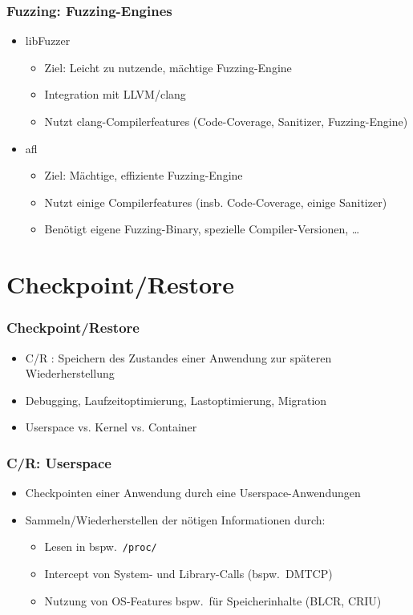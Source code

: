 \documentclass[handout]{beamer}
\begin{document}
\begin{frame}
    \frametitle{Fuzzing: Fuzzing-Engines}
    \begin{itemize}
        \item libFuzzer
            \begin{itemize}
                \item Ziel: Leicht zu nutzende, mächtige Fuzzing-Engine
                \item Integration mit LLVM/clang
                \item Nutzt clang-Compilerfeatures (Code-Coverage, Sanitizer, Fuzzing-Engine)
            \end{itemize}
        \item afl
            \begin{itemize}
                \item Ziel: Mächtige, effiziente Fuzzing-Engine
                \item Nutzt einige Compilerfeatures (insb. Code-Coverage, einige Sanitizer)
                \item Benötigt eigene Fuzzing-Binary, spezielle Compiler-Versionen, \dots
            \end{itemize}
    \end{itemize}
\end{frame}

\section{Checkpoint/Restore}
\begin{frame}
    \frametitle{Checkpoint/Restore}
    \begin{itemize}
        \item C/R : Speichern des Zustandes einer Anwendung zur späteren Wiederherstellung
        \item Debugging, Laufzeitoptimierung, Lastoptimierung, Migration
        \item Userspace vs. Kernel vs. Container
    \end{itemize}
\end{frame}

\begin{frame}
    \frametitle{C/R: Userspace}
    \begin{itemize}
        \item Checkpointen einer Anwendung durch eine Userspace-Anwendungen
        \item Sammeln/Wiederherstellen der nötigen Informationen durch:
            \begin{itemize}
                \item Lesen in bspw.\ \texttt{/proc/}
                \item Intercept von System- und Library-Calls (bspw.\ DMTCP)
                \item Nutzung von OS-Features bspw.\ für Speicherinhalte (BLCR, CRIU)
            \end{itemize}
    \end{itemize}
\end{frame}
\end{document}
